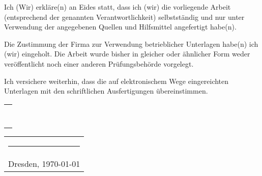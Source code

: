\documentclass[../main.tex]{subfiles}
\begin{document}
        Ich (Wir) erkläre(n) an Eides statt, dass ich (wir) die vorliegende Arbeit (entsprechend
	der genannten Verantwortlichkeit) selbstständig und nur unter Verwendung der angegebenen
	Quellen und Hilfsmittel angefertigt habe(n).
	\medskip

	Die Zustimmung der Firma zur Verwendung betrieblicher Unterlagen habe(n) ich (wir)
	eingeholt. Die Arbeit wurde bisher in gleicher oder ähnlicher Form weder
	veröffentlicht noch einer anderen Prüfungsbehörde vorgelegt.
	\medskip

	Ich versichere weiterhin, dass die auf elektronischem Wege eingereichten Unterlagen
	mit den schriftlichen Ausfertigungen übereinstimmen.

	\vspace{15mm}
	\hfill%
	\begin{tabular}[t]{c}
		\rule{10em}{0.4pt}      \\
		\theauthor
	\end{tabular}%
	\hfill%
	\begin{tabular}[t]{c}
		\rule{10em}{0.4pt} \\
		Dresden, \today
	\end{tabular}%
	\hfill\strut
\end{document}
